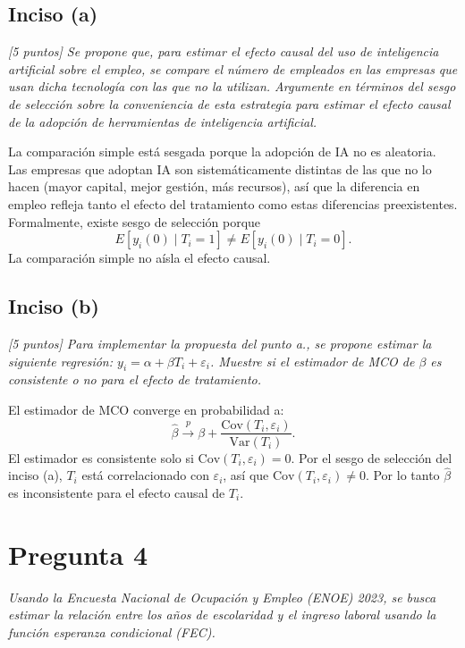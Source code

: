 \documentclass[12pt]{article}
\begin{document}
\subsection*{Inciso (a)}

\textit{[5 puntos] Se propone que, para estimar el efecto causal del uso de inteligencia artificial sobre el empleo, se compare el número de empleados en las empresas que usan dicha tecnología con las que no la utilizan. Argumente en términos del sesgo de selección sobre la conveniencia de esta estrategia para estimar el efecto causal de la adopción de herramientas de inteligencia artificial.}

La comparación simple está sesgada porque la adopción de IA no es aleatoria. Las empresas que adoptan IA son sistemáticamente distintas de las que no lo hacen (mayor capital, mejor gestión, más recursos), así que la diferencia en empleo refleja tanto el efecto del tratamiento como estas diferencias preexistentes. Formalmente, existe sesgo de selección porque
\[
E[y_i(0) \mid T_i = 1] \neq E[y_i(0) \mid T_i = 0].
\]
La comparación simple no aísla el efecto causal.

\subsection*{Inciso (b)}

\textit{[5 puntos] Para implementar la propuesta del punto a., se propone estimar la siguiente regresión: $y_i = \alpha + \beta T_i + \varepsilon_i$. Muestre si el estimador de MCO de $\beta$ es consistente o no para el efecto de tratamiento.}

El estimador de MCO converge en probabilidad a:
\[
\hat{\beta} \xrightarrow{p} \beta + \frac{\text{Cov}(T_i, \varepsilon_i)}{\text{Var}(T_i)}.
\]
El estimador es consistente solo si $\text{Cov}(T_i, \varepsilon_i) = 0$. Por el sesgo de selección del inciso (a), $T_i$ está correlacionado con $\varepsilon_i$, así que $\text{Cov}(T_i, \varepsilon_i) \neq 0$. Por lo tanto $\hat{\beta}$ es inconsistente para el efecto causal de $T_i$.

\section{Pregunta 4}

\textit{Usando la Encuesta Nacional de Ocupación y Empleo (ENOE) 2023, se busca estimar la relación entre los años de escolaridad y el ingreso laboral usando la función esperanza condicional (FEC).}
\end{document}
